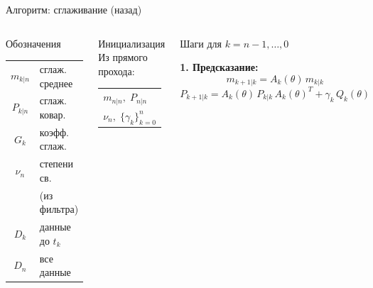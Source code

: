 \documentclass{beamer}
\begin{document}
\begin{frame}{Алгоритм: сглаживание (назад)}
\footnotesize

\begin{columns}[T]

    \begin{block}{\footnotesize Обозначения}
        \vspace{2pt}
        {\footnotesize
        \begin{tabular}{cl}
            $m_{k|n}$     & сглаж. среднее  \\[3pt]
            $P_{k|n}$     & сглаж. ковар.   \\[3pt]
            $G_k$         & коэфф. сглаж.   \\[3pt]
            $\nu_n$       & степени св.     \\[3pt]
                          & (из фильтра)    \\[6pt]
            $D_k$         & данные до $t_k$ \\[3pt]
            $D_n$         & все данные      \\
        \end{tabular}}
    \end{block}

    \vspace{3pt}

    \begin{block}{\footnotesize Инициализация}
        \vspace{2pt}
        Из прямого прохода:\\[3pt]
        {\footnotesize
        \begin{tabular}{l}
            $m_{n|n},\; P_{n|n}$ \\[3pt]
            $\nu_n,\; \{\gamma_k\}_{k=0}^{n}$ \\
        \end{tabular}}
    \end{block}

    \vspace{3pt}

    \begin{block}{\footnotesize Шаги для $k = n-1, \ldots, 0$}
        \vspace{2pt}

        \textbf{1. Предсказание:}
        \vspace{-4pt}
        $$
            m_{k+1|k} = A_{k}(\theta)\,m_{k|k}
        $$
        \vspace{-14pt}
        $$
            P_{k+1|k} = A_{k}(\theta)\,P_{k|k}\,A_{k}(\theta)^T
            + \gamma_{k}\,Q_{k}(\theta)
        $$


\end{block}
\end{columns}
\end{frame}
\end{document}
